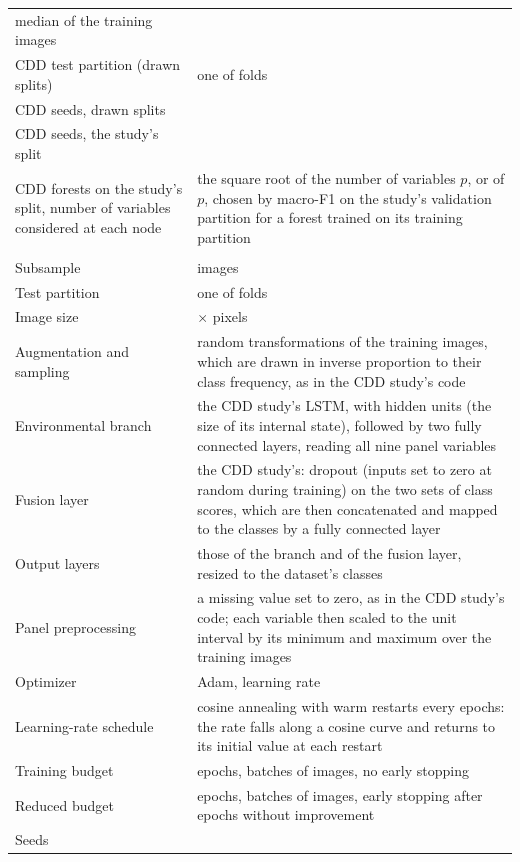 \documentclass[11pt]{article}
\begin{document}
\begin{table}[H]
\begin{tabular}{>{\raggedright\arraybackslash}p{}>{\raggedright\arraybackslash}p{}}
median of the training images \\
CDD test partition (drawn splits) & one of \cddFolds{} folds \\
CDD seeds, drawn splits & \cddSeeds{} \\
CDD seeds, the study's split & \cddTheirSeeds{} \\
CDD forests on the study's split, number of variables considered at each node & the
square root of the number of variables $p$, or \cddGridFractions{} of $p$, chosen by
macro-F1 on the study's validation partition for a forest trained on its training
partition \\
\midrule
\multicolumn{2}{l}{\emph{Fusion experiment on the AI Hub dataset}} \\
Subsample & \subsampleSize{} images \\
Test partition & one of \fusionFolds{} folds \\
Image size & \imagePixels{} $\times$ \imagePixels{} pixels \\
Augmentation and sampling & random transformations of the training images, which
are drawn in inverse proportion to their class frequency, as in the CDD study's
code \\
Environmental branch & the CDD study's LSTM, with \lstmHidden{} hidden units (the size of its internal
state), followed by two fully connected layers, reading all nine panel variables \\
Fusion layer & the CDD study's: dropout (inputs set to zero at random during training) on the two
sets of class scores, which are then concatenated and mapped to the classes by a fully connected layer \\
Output layers & those of the branch and of the fusion layer, resized to the
dataset's classes \\
Panel preprocessing & a missing value set to zero, as in the CDD study's code;
each variable then scaled to the unit interval by its minimum and maximum over the
training images \\
Optimizer & Adam, learning rate \learningRate{} \\
Learning-rate schedule & cosine annealing with warm restarts every
\restartEpochs{} epochs: the rate falls along a cosine curve and returns to its
initial value at each restart \\
Training budget & \matchedEpochs{} epochs, batches of \matchedBatch{} images, no
early stopping \\
Reduced budget & \lowBudgetEpochs{} epochs, batches of \lowBudgetBatch{} images,
early stopping after \earlyStopPatience{} epochs without improvement \\
Seeds & \fusionSeeds{} \\
\bottomrule
\end{tabular}
\end{table}
\end{document}
